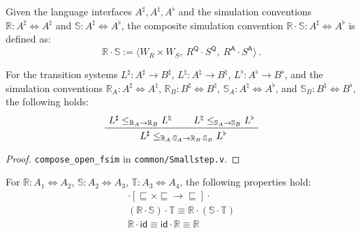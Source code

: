 \documentclass[sigplan,10pt,review,anonymous]{acmart}\settopmatter{printfolios=true,printccs=false,printacmref=false}
\newcommand{\kw}[1]{\ensuremath{ \mathsf{#1} }}
\newcommand{\ifr}[1]{\mathrel{[{#1}]}}
\begin{document}
\begin{definition} %
Given the language interfaces $A^\sharp, A^\natural, A^\flat$
and the simulation conventions
$\mathbb{R} : A^\sharp \Leftrightarrow A^\natural$ and
$\mathbb{S} : A^\natural \Leftrightarrow A^\flat$,
the composite simulation convention
$\mathbb{R} \cdot \mathbb{S} : A^\sharp \Leftrightarrow A^\flat$ is defined as:
\[
    \mathbb{R} \cdot \mathbb{S} :=
      \langle
        W_R \times W_S, \:
        R^\kw{Q} \cdot S^\kw{Q}, \:
        R^\kw{A} \cdot S^\kw{A}
      \rangle \,.
\]
\end{definition}

\begin{theorem} \label{thm:simcomp} %
For the transition systems
$L^\sharp : A^\sharp \rightarrow B^\sharp$,
$L^\natural : A^\natural \rightarrow B^\natural$,
$L^\flat : A^\flat \rightarrow B^\flat$,
and the simulation conventions
$\mathbb{R}_A : A^\sharp \Leftrightarrow A^\natural$,
$\mathbb{R}_B : B^\sharp \Leftrightarrow B^\natural$,
$\mathbb{S}_A : A^\natural \Leftrightarrow A^\flat$, and
$\mathbb{S}_B : B^\natural \Leftrightarrow B^\flat$,
the following holds:
\[
  \AxiomC{$L^\sharp \le_{\mathbb{R}_A \rightarrow \mathbb{R}_B} L^\natural$}
  \AxiomC{$L^\natural \le_{\mathbb{S}_A \rightarrow \mathbb{S}_B} L^\flat$}
  \BinaryInfC{
    $L^\sharp \le_{\mathbb{R}_A \cdot \mathbb{S}_A \rightarrow
                   \mathbb{R}_B \cdot \mathbb{S}_B} L^\flat$}
  \DisplayProof
\]
\begin{proof}
\texttt{compose\_open\_fsim} in \texttt{common/Smallstep.v}.
\end{proof}
\end{theorem}

\begin{theorem} %
For
$\mathbb{R} : A_1 \Leftrightarrow A_2$,
$\mathbb{S} : A_2 \Leftrightarrow A_3$,
$\mathbb{T} : A_3 \Leftrightarrow A_4$,
the following properties hold:
\begin{gather*}
  {\cdot} \ifr{{\sqsubseteq} \times {\sqsubseteq} \rightarrow
               {\sqsubseteq}} {\cdot}
  \\
  (\mathbb{R} \cdot \mathbb{S}) \cdot \mathbb{T} \equiv
    \mathbb{R} \cdot (\mathbb{S} \cdot \mathbb{T})
  \\
  \mathbb{R} \cdot \kw{id} \equiv
  \kw{id} \cdot \mathbb{R} \equiv
  \mathbb{R}
\end{gather*}
\end{theorem}
\end{document}
